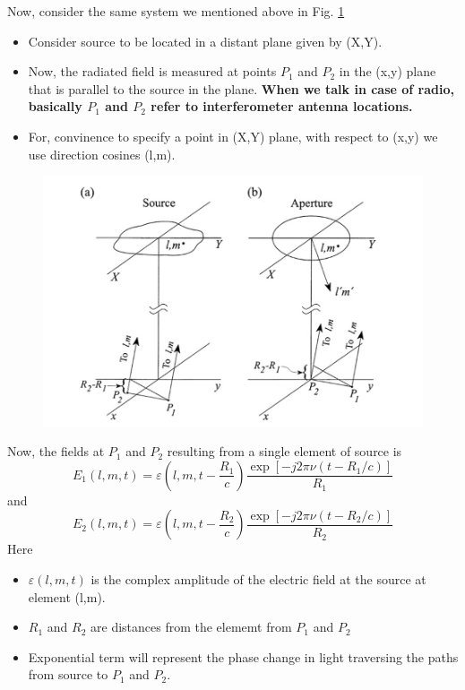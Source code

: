 \documentclass[10pt]{report}
\begin{document}
Now, consider the same system we mentioned above in Fig. \ref{VCZb}
\begin{itemize}
\item Consider source to be located in a distant plane given by (X,Y). 
\item Now, the radiated field is measured at points $P_1$ and $P_2$ in the (x,y) plane that is parallel to the source in the plane. \textbf{When we talk in case of radio, basically $P_1$ and $P_2$ refer to interferometer antenna locations.}
\item For, convinence to specify a point in (X,Y) plane, with respect to (x,y) we use direction cosines (l,m).
\end{itemize}
\begin{figure}[h!]
\includegraphics[width=\linewidth]{notesfig1.png}
\label{VCZb}
\end{figure}
Now, the fields at $P_1$ and $P_2$ resulting from a single element of source  is
\begin{equation}
E_1(l,m,t)=\varepsilon(l,m,t-\frac{R_1}{c})\frac{\exp[-j2\pi\nu(t-R_1/c)]}{R_1}
\end{equation}
and 
\begin{equation}
E_2(l,m,t)=\varepsilon(l,m,t-\frac{R_2}{c})\frac{\exp[-j2\pi\nu(t-R_2/c)]}{R_2}
\end{equation}
Here
\begin{itemize}
\item $\varepsilon(l,m,t)$ is the complex amplitude of the electric field at the source at element (l,m).
\item $R_1$ and $R_2$ are distances from the elememt from $P_1$ and $P_2$
\item Exponential term will represent the phase change in light traversing the paths from source to $P_1$ and $P_2$.
\end{itemize}
\end{document}
